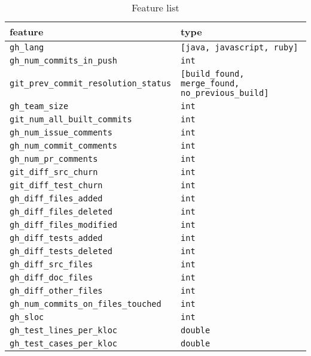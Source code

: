 \begin{table}
	\label{featureTable}
	\caption{Feature list}
	\begin{tabular}{ l l }
		feature & type \\
		\hline
		\texttt{gh\_lang} &                             \texttt{[java, javascript, ruby]} \\ 
		\texttt{gh\_num\_commits\_in\_push} &              \texttt{int} \\ 
		\texttt{git\_prev\_commit\_resolution\_status} &   \texttt{[build\_found, merge\_found, no\_previous\_build]} \\ 
		\texttt{gh\_team\_size} &                        \texttt{int} \\ 
		\texttt{git\_num\_all\_built\_commits} &           \texttt{int} \\ 
		\texttt{gh\_num\_issue\_comments} &               \texttt{int} \\ 
		\texttt{gh\_num\_commit\_comments} &              \texttt{int} \\      
		\texttt{gh\_num\_pr\_comments} &                  \texttt{int} \\ 
		\texttt{git\_diff\_src\_churn} &                  \texttt{int} \\ 
		\texttt{git\_diff\_test\_churn} &                 \texttt{int} \\ 
		\texttt{gh\_diff\_files\_added} &                 \texttt{int} \\ 
		\texttt{gh\_diff\_files\_deleted} &               \texttt{int} \\ 
		\texttt{gh\_diff\_files\_modified} &              \texttt{int} \\ 
		\texttt{gh\_diff\_tests\_added} &                 \texttt{int} \\ 
		\texttt{gh\_diff\_tests\_deleted} &               \texttt{int} \\ 
		\texttt{gh\_diff\_src\_files} &                   \texttt{int} \\ 
		\texttt{gh\_diff\_doc\_files} &                   \texttt{int} \\ 
		\texttt{gh\_diff\_other\_files} &                 \texttt{int} \\ 
		\texttt{gh\_num\_commits\_on\_files\_touched} &     \texttt{int} \\ 
		\texttt{gh\_sloc} &                             \texttt{int} \\ 
		\texttt{gh\_test\_lines\_per\_kloc} &              \texttt{double} \\ 
		\texttt{gh\_test\_cases\_per\_kloc} &              \texttt{double} \\ 

\end{tabular}
\end{table}
